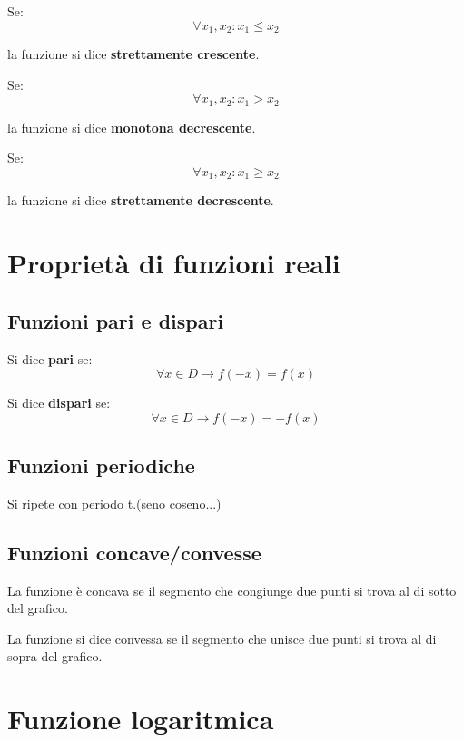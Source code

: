 \documentclass{article}
\begin{document}
Se: 
\begin{equation*}
    \forall x_1,x_2 : x_1 \leq x_2
\end{equation*}

la funzione si dice \textbf{strettamente crescente}.

Se: 
\begin{equation*}
    \forall x_1,x_2 : x_1 > x_2
\end{equation*}

la funzione si dice \textbf{monotona decrescente}.

Se: 
\begin{equation*}
    \forall x_1,x_2 : x_1 \geq x_2
\end{equation*}

la funzione si dice \textbf{strettamente decrescente}.


\section{Proprietà di funzioni reali}
\subsection{Funzioni pari e dispari}

Si dice \textbf{pari} se:
\begin{equation*}
    \forall x \in D \rightarrow f(-x) = f(x)
\end{equation*}

Si dice \textbf{dispari} se:
\begin{equation*}
    \forall x \in D \rightarrow f(-x) = -f(x)
\end{equation*}

\subsection{Funzioni periodiche}
Si ripete con periodo t.(seno coseno...)

\subsection{Funzioni concave/convesse}
La funzione è concava se il segmento che congiunge due punti si trova al di sotto del grafico.

La funzione si dice convessa se il segmento che unisce due punti si trova al di sopra del grafico.

\section{Funzione logaritmica}
\end{document}
